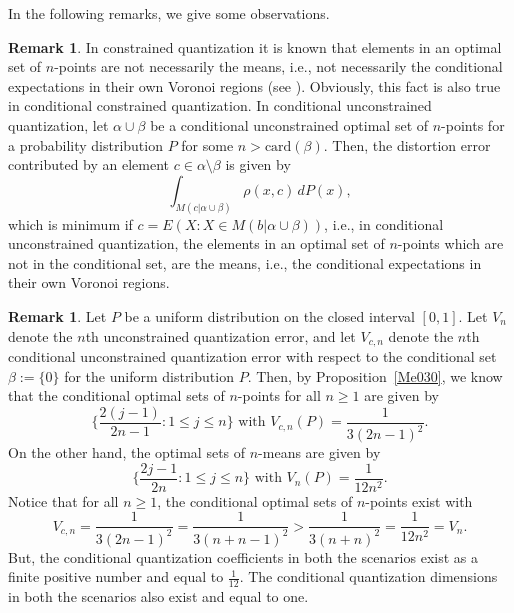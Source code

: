 \documentclass[12pt, reqno]{amsart}
\theoremstyle{plain}
\theoremstyle{definition}
\newtheorem{remark}[subsection]{Remark}
\newcommand{\uu}{\cup}%
\newcommand{\set}[1]{\{#1\}}%
\newcommand{\ga}{\alpha}
\newcommand{\gb}{\beta}
\newcommand{\te}{\text}%
\begin{document}
In the following remarks, we give some observations. 

\begin{remark} \label{REM1} 
In constrained quantization it is known that elements in an optimal set of $n$-points are not necessarily the means, i.e., not necessarily the conditional expectations in their own Voronoi regions (see \cite{PR1}). Obviously, this fact is also true in conditional constrained quantization. In conditional unconstrained quantization, let $\ga\uu\gb$ be a conditional unconstrained optimal set of $n$-points for a probability distribution $P$ for some $n>\te{card}(\gb)$. Then, the distortion error contributed by an element $c\in \ga\setminus\gb$ is given by 
\[\int_{M(c|\ga\uu \gb)}\rho(x, c) \,dP(x),\]
which is minimum if $c=E(X : X\in M(b|\ga\uu \gb))$, i.e., in conditional unconstrained quantization, the elements in an optimal set of $n$-points which are not in the conditional set, are the means, i.e., the conditional expectations in their own Voronoi regions. 
\end{remark} 

\begin{remark}
Let $P$ be a uniform distribution on the closed interval $[0, 1]$. Let $V_n$ denote the $n$th unconstrained quantization error, and let $V_{c, n}$ denote the $n$th conditional unconstrained quantization error with respect to the conditional set $\gb:=\set{0}$ for the uniform distribution $P$. Then, by Proposition~\ref{Me030}, we know that the conditional optimal sets of $n$-points for all $n\geq 1$ are given by 
\[\Big\{\frac{2(j-1)}{2n-1} : 1\leq j\leq n\Big\} \te{ with } V_{c, n}(P)=\frac 1{3(2n-1)^2}.\]
On the other hand, the optimal sets of $n$-means are given by 
\[\Big\{\frac{2j-1}{2n} : 1\leq j\leq n\Big\} \te{ with } V_{n}(P)=\frac 1{12 n^2}.\]
Notice that for all $n\geq 1$, the conditional optimal sets of $n$-points exist with 
\[V_{c, n}=\frac 1{3(2n-1)^2}=\frac 1{3( n+n-1)^2}>\frac 1{3( n+n)^2}=\frac 1{12 n^2}=V_n.\]
But, the conditional quantization coefficients in both the scenarios exist as a finite positive number and equal to $\frac 1{12}$. The conditional quantization dimensions in both the scenarios also exist and equal to one. 
\end{remark} 
\end{document}
